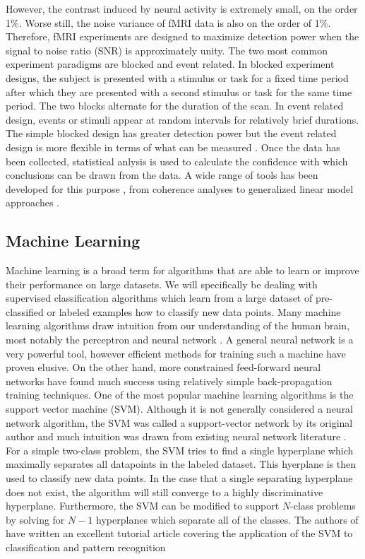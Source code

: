 \documentclass[12pt]{article}
\begin{document}
However, the contrast induced by neural activity is extremely small, on the order 1\%.
Worse still, the noise variance of fMRI data is also on the order of 1\%.
Therefore, fMRI experiments are designed to maximize detection power when the signal to noise ratio (SNR) is approximately unity.
The two most common experiment paradigms are blocked and event related.
In blocked experiment designs, the subject is presented with a stimulus or task for a fixed time period after which they are presented with a second stimulus or task for the same time period.
The two blocks alternate for the duration of the scan.
In event related design, events or stimuli appear at random intervals for relatively brief durations.
The simple blocked design has greater detection power but the event related design is more flexible in terms of what can be measured \cite{Dale1997,Liu2001}.
Once the data has been collected, statistical anlysis is used to calculate the confidence with which conclusions can be drawn from the data.
A wide range of tools has been developed for this purpose \cite{Bandettini1993}, from coherence analyses to generalized linear model approaches \cite{Worsley1995,Beckmann2003}.

\subsection{Machine Learning}
Machine learning is a broad term for algorithms that are able to learn or improve their performance on large datasets.
We will specifically be dealing with supervised classification algorithms which learn from a large dataset of pre-classified or labeled examples how to classify new data points.
Many machine learning algorithms draw intuition from our understanding of the human brain, most notably the perceptron and neural network \cite{Hecht-nielsen1989,Jain1996}.
A general neural network is a very powerful tool, however efficient methods for training such a machine have proven elusive.
On the other hand, more constrained feed-forward neural networks have found much success using relatively simple back-propagation training techniques.
One of the most popular machine learning algorithms is the support vector machine (SVM).
Although it is not generally considered a neural network algorithm, the SVM was called a support-vector network by its original author and much intuition was drawn from existing neural network literature \cite{Cortes1995}.
For a simple two-class problem, the SVM tries to find a single hyperplane which maximally separates all datapoints in the labeled dataset.
This hyerplane is then used to classify new data points.
In the case that a single separating hyperplane does not exist, the algorithm will still converge to a highly discriminative hyperplane.
Furthermore, the SVM can be modified to support $N$-class problems by solving for $N-1$ hyperplanes which separate all of the classes.
The authors of \cite{Burges1998} have written an excellent tutorial article covering the application of the SVM to classification and pattern recognition
\end{document}
